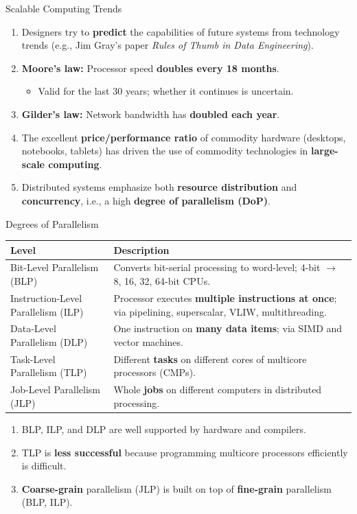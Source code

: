\begin{frame}{Scalable Computing Trends}
\begin{enumerate}
\item<1-> Designers try to \textbf{predict} the capabilities of future systems from technology trends (e.g., Jim Gray's paper \textit{Rules of Thumb in Data Engineering}).
\item<2-> \textbf{Moore's law:} Processor speed \textbf{doubles every 18 months}.
    \begin{itemize}
    \item Valid for the last 30 years; whether it continues is uncertain.
    \end{itemize}
\item<3-> \textbf{Gilder's law:} Network bandwidth has \textbf{doubled each year}.
\item<4-> The excellent \textbf{price/performance ratio} of commodity hardware (desktops, notebooks, tablets) has driven the use of commodity technologies in \textbf{large-scale computing}.
\item<5-> Distributed systems emphasize both \textbf{resource distribution} and \textbf{concurrency}, i.e., a high \textbf{degree of parallelism (DoP)}.
\end{enumerate}
\end{frame}

\begin{frame}{Degrees of Parallelism}
\begin{table}
\centering
\renewcommand{\arraystretch}{1.3}
\scriptsize
\begin{tabular}{|p{3.8cm}|p{9.4cm}|}
\hline
\textbf{Level} & \textbf{Description} \\ \hline
Bit-Level Parallelism (BLP) & Converts bit-serial processing to word-level; 4-bit $\rightarrow$ 8, 16, 32, 64-bit CPUs. \\ \hline
Instruction-Level Parallelism (ILP) & Processor executes \textbf{multiple instructions at once}; via pipelining, superscalar, VLIW, multithreading. \\ \hline
Data-Level Parallelism (DLP) & One instruction on \textbf{many data items}; via SIMD and vector machines. \\ \hline
Task-Level Parallelism (TLP) & Different \textbf{tasks} on different cores of multicore processors (CMPs). \\ \hline
Job-Level Parallelism (JLP) & Whole \textbf{jobs} on different computers in distributed processing. \\ \hline
\end{tabular}
\end{table}
\begin{enumerate}
\item<1-> BLP, ILP, and DLP are well supported by hardware and compilers.
\item<2-> TLP is \textbf{less successful} because programming multicore processors efficiently is difficult.
\item<3-> \textbf{Coarse-grain} parallelism (JLP) is built on top of \textbf{fine-grain} parallelism (BLP, ILP).
\end{enumerate}
\end{frame}

